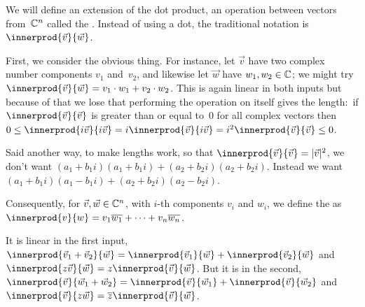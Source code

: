 We will define an extension of the dot product, an
operation between vectors from~$\mathbb{C}^n$ called the .
Instead of using a dot, the traditional notation is
$\innerprod{\vec{v}}{\vec{w}}$.

First, we consider the obvious thing. 
For instance, let
$\vec{v}$ have two complex number components $v_1$ and~$v_2$,
and likewise let $\vec{w}$ have $w_1,w_2\in\mathbb{C}$;
we might try  
$\innerprod{\vec{v}}{\vec{w}}=v_1\cdot w_1+v_2\cdot w_2$.
This is again linear in both inputs but because of that 
we lose that performing the operation on itself gives the length:~if
$\innerprod{\vec{v}}{\vec{v}}$ is greater than or equal to~$0$ for all
complex vectors
then 
$0\leq \innerprod{i\vec{v}}{i\vec{v}}
  =i\innerprod{\vec{v}}{i\vec{v}}
  =i^2\innerprod{\vec{v}}{\vec{v}}\leq 0$.

Said another way, to make lengths work, 
so that $\innerprod{\vec{v}}{\vec{v}}=\absval{\vec{v}}^2$, 
we don't want
$(a_1+b_1i)(a_1+b_1i)+(a_2+b_2i)(a_2+b_2i)$. 
Instead we want
$(a_1+b_1i)(a_1-b_1i)+(a_2+b_2i)(a_2-b_2i)$.

Consequently, for $\vec{v},\vec{w}\in\mathbb{C}^n$, with $i$-th components $v_i$ 
and $w_i$, we define the 
as $\innerprod{v}{w}=v_1\compconj{w_1}+\cdots+v_n\compconj{w_n}$.

It is linear in the first input,
$\innerprod{\vec{v}_1+\vec{v}_2}{\vec{w}}
 = \innerprod{\vec{v}_1}{\vec{w}}
   +\innerprod{\vec{v}_2}{\vec{w}}$
and $\innerprod{z\vec{v}}{\vec{w}}
     =z\innerprod{\vec{v}}{\vec{w}}$.
But it is  in the second,
$\innerprod{\vec{v}}{\vec{w}_1+\vec{w}_2}
 = \innerprod{\vec{v}}{\vec{w}_1}
   +\innerprod{\vec{v}}{\vec{w}_2}$
and $\innerprod{\vec{v}}{z\vec{w}}
     =\compconj{z}\innerprod{\vec{v}}{\vec{w}}$.




\endinput
% 